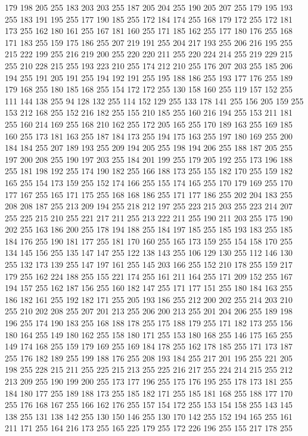 179 198 205 255 183 203 203 255 187 205 204 255 190 205 207 255 179 195 193 255 183 191 195 255 177 190 185 255 172 184 174 255 168 179 172 255 172 181 173 255 162 180 161 255 167 181 160 255 171 185 162 255 177 180 176 255 168 171 183 255 159 175 186 255
207 219 191 255 204 217 193 255 206 216 195 255 215 222 199 255 216 219 200 255 220 220 211 255 220 224 214 255 219 229 215 255 210 228 215 255 193 223 210 255 174 212 210 255 176 207 203 255 185 206 194 255 191 205 191 255 194 192 191 255 195 188 186 255
193 177 176 255 189 179 168 255 180 185 168 255 154 172 172 255 130 158 160 255 119 157 152 255 111 144 138 255 94 128 132 255 114 152 129 255 133 178 141 255 156 205 159 255 153 212 168 255 152 216 182 255 155 210 185 255 160 216 194 255 153 211 181 255
160 214 169 255 168 210 162 255 172 205 165 255 170 189 163 255 169 185 160 255 173 181 163 255 187 184 173 255 194 175 163 255 197 180 169 255 200 184 184 255 207 189 193 255 209 194 205 255 198 194 206 255 188 187 205 255 197 200 208 255 190 197 203 255
184 201 199 255 179 205 192 255 173 196 188 255 181 198 192 255 174 190 182 255 166 188 173 255 155 182 170 255 159 182 165 255 154 173 159 255 152 174 166 255 155 174 165 255 170 179 169 255 170 177 167 255 165 171 175 255 168 168 186 255 171 177 186 255
202 204 183 255 208 208 187 255 213 209 194 255 218 212 197 255 223 215 203 255 223 214 207 255 225 215 210 255 221 217 211 255 213 222 211 255 190 211 203 255 175 190 202 255 163 186 200 255 178 194 188 255 184 197 185 255 185 193 183 255 185 184 176 255
190 181 177 255 181 170 160 255 165 173 159 255 154 158 170 255 134 145 156 255 135 147 147 255 122 138 143 255 106 129 130 255 112 146 130 255 132 173 139 255 147 197 161 255 145 203 166 255 152 210 178 255 159 217 179 255 162 224 188 255 155 221 174 255
161 211 164 255 171 209 152 255 167 194 157 255 162 187 156 255 160 182 147 255 171 177 151 255 180 184 163 255 186 182 161 255 192 182 171 255 205 193 186 255 212 200 202 255 214 203 210 255 210 202 208 255 207 201 213 255 206 200 213 255 201 204 206 255
189 198 196 255 174 190 183 255 168 188 178 255 175 188 179 255 171 182 173 255 156 180 164 255 149 180 162 255 158 180 171 255 153 180 168 255 146 175 165 255 149 174 168 255 159 179 169 255 169 184 178 255 162 178 185 255 171 173 187 255 176 182 189 255
199 188 176 255 208 193 184 255 217 201 195 255 221 205 198 255 228 215 211 255 225 215 213 255 225 216 217 255 224 214 215 255 212 213 209 255 190 199 200 255 173 177 196 255 175 176 195 255 178 173 181 255 184 180 177 255 189 188 173 255 185 182 171 255
185 181 168 255 188 177 170 255 176 168 167 255 166 162 176 255 157 154 172 255 153 154 158 255 143 145 138 255 131 138 142 255 130 150 146 255 130 170 142 255 152 194 165 255 161 211 171 255 164 216 173 255 165 225 179 255 172 226 196 255 155 217 178 255
